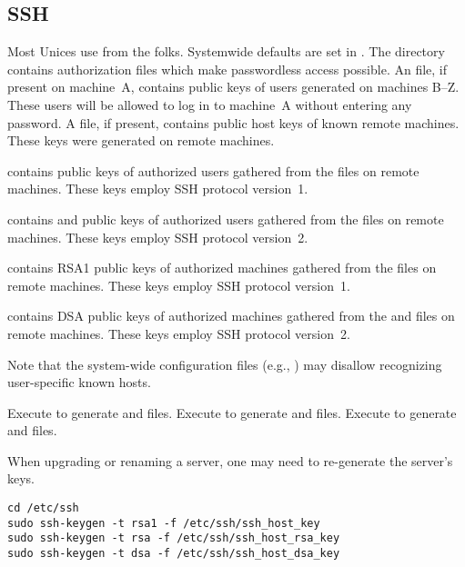 \documentclass[12pt,twoside]{article}
\begin{document}
\subsection{SSH}\label{sxn:ssh}
Most Unices use  from the  folks.
Systemwide defaults are set in .
The directory  contains authorization files which make 
passwordless access possible.
An  file, if present on machine~A, contains
public keys of users generated on machines B--Z. 
These users will be allowed to log in to machine~A without entering
any password.
A  file, if present, contains public host keys of  
known remote machines. 
These keys were generated on remote machines.
\begin{enumerate*}
\item {} contains  public keys of
  authorized users gathered from the  files on
  remote machines. 
  These keys employ SSH protocol version~1.
\item {} contains  and 
  public keys of authorized users gathered from the 
  files on remote machines. 
  These keys employ SSH protocol version~2.
\item {} contains RSA1 public keys of authorized
  machines gathered from the  files
  on remote machines. 
  These keys employ SSH protocol version~1.
\item {} contains DSA public keys of authorized
  machines gathered from the 
  and   files on remote machines. 
  These keys employ SSH protocol version~2.
\item Note that the system-wide configuration files (e.g.,
  ) may disallow recognizing user-specific
  known hosts. 
\end{enumerate*}
Execute  to generate  and  files.
Execute  to generate  and  files.
Execute  to generate  and  files. 

When upgrading or renaming a server, one may need to re-generate the
server's keys.
\begin{verbatim}
cd /etc/ssh
sudo ssh-keygen -t rsa1 -f /etc/ssh/ssh_host_key
sudo ssh-keygen -t rsa -f /etc/ssh/ssh_host_rsa_key
sudo ssh-keygen -t dsa -f /etc/ssh/ssh_host_dsa_key
\end{verbatim}
\end{document}
